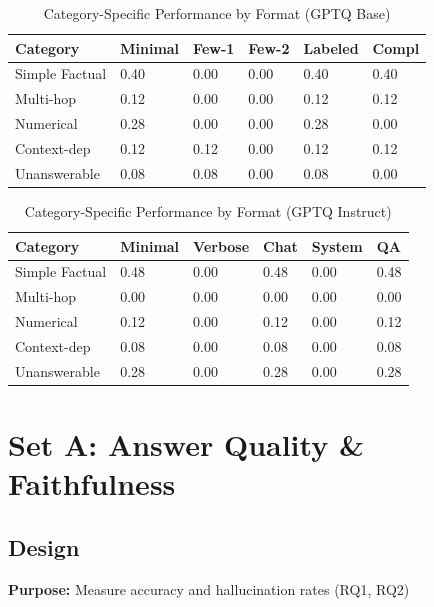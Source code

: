 \documentclass[11pt,a4paper]{article}
\begin{document}
\begin{table}[H]
\centering
\caption{Category-Specific Performance by Format (GPTQ Base)}
\small
\begin{tabularx}{\textwidth}{@{}X C{1.4cm} C{1.4cm} C{1.4cm} C{1.4cm} C{1.4cm}@{}}
\toprule
\textbf{Category} & \textbf{Minimal} & \textbf{Few-1} & \textbf{Few-2} & \textbf{Labeled} & \textbf{Compl} \\
\midrule
Simple Factual & 0.40 & 0.00 & 0.00 & 0.40 & 0.40 \\
Multi-hop & 0.12 & 0.00 & 0.00 & 0.12 & 0.12 \\
Numerical & 0.28 & 0.00 & 0.00 & 0.28 & 0.00 \\
Context-dep & 0.12 & 0.12 & 0.00 & 0.12 & 0.12 \\
Unanswerable & 0.08 & 0.08 & 0.00 & 0.08 & 0.00 \\
\bottomrule
\end{tabularx}
\end{table}

\begin{table}[H]
\centering
\caption{Category-Specific Performance by Format (GPTQ Instruct)}
\small
\begin{tabularx}{\textwidth}{@{}X C{1.4cm} C{1.4cm} C{1.4cm} C{1.4cm} C{1.4cm}@{}}
\toprule
\textbf{Category} & \textbf{Minimal} & \textbf{Verbose} & \textbf{Chat} & \textbf{System} & \textbf{QA} \\
\midrule
Simple Factual & 0.48 & 0.00 & 0.48 & 0.00 & 0.48 \\
Multi-hop & 0.00 & 0.00 & 0.00 & 0.00 & 0.00 \\
Numerical & 0.12 & 0.00 & 0.12 & 0.00 & 0.12 \\
Context-dep & 0.08 & 0.00 & 0.08 & 0.00 & 0.08 \\
Unanswerable & 0.28 & 0.00 & 0.28 & 0.00 & 0.28 \\
\bottomrule
\end{tabularx}
\end{table}

\newpage
\section{Set A: Answer Quality \& Faithfulness}

\subsection{Design}

\textbf{Purpose:} Measure accuracy and hallucination rates (RQ1, RQ2)
\end{document}
